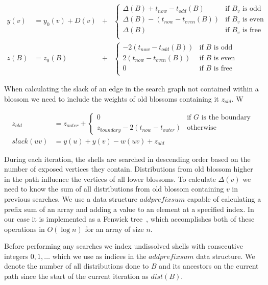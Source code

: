 \begin{align*}
    y(v) &= y_0(v) + D(v) &+ 
    &\begin{cases}
        \Delta(B) + t_{now} - t_{odd}(B) & \text{if $B_v$ is odd} \\
        \Delta(B) - (t_{now} - t_{even}(B)) & \text{if $B_v$ is even} \\
        \Delta(B) & \text{if $B_v$ is free} \\
    \end{cases} \\
    z(B) &= z_0(B) &+ 
    &\begin{cases}
        -2(t_{now} - t_{odd}(B)) & \text{if $B$ is odd} \\
        2(t_{now} - t_{even}(B)) & \text{if $B$ is even} \\
        0 & \text{if $B$ is free} \\
    \end{cases}
\end{align*}

When calculating the slack of an edge in the search graph not contained within a blossom we need to include the weights of old blossoms containing it $z_{old}$. W

\begin{align*}
    z_{old} &= z_{outer} + \begin{cases}
        0 & \text{if $G$ is the boundary} \\
        z_{boundary} - 2(t_{now} - t_{outer}) & \text{otherwise}
    \end{cases} \\
    slack(uv) &= y(u) + y(v) - w(uv) + z_{old}
\end{align*}

During each iteration, the shells are searched in descending order based on the number of exposed vertices they contain. Distributions from old blossom higher in the path influence the vertices of all lower blossoms. To calculate $\Delta(v)$ we need to know the sum of all distributions from old blossom containing $v$ in previous searches. We use a data structure $addprefixsum$ capable of calculating a prefix sum of an array and adding a value to an element at a specified index. In our case it is implemented as a Fenwick tree~\cite{Fenwick1994AND}, which accomplishes both of these operations in $O(\log n)$ for an array of size $n$. 

Before performing any searches we index undissolved shells with consecutive integers $0, 1, \dots$ which we use as indices in the $addprefixsum$ data structure. We denote the number of all distributions done to $B$ and its ancestors on the current path since the start of the current iteration as $dist(B)$.

